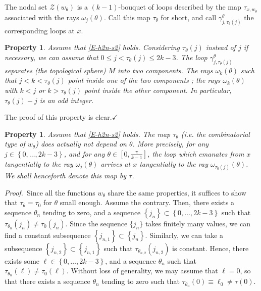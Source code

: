 \documentclass[12pt,a4paper]{amsart}
\theoremstyle{plain} %
\newtheorem{property}[theorem]{Property}
\theoremstyle{definition}
\numberwithin{equation}{section}
\numberwithin{figure}{section}
\numberwithin{table}{section}
\newcommand{\cZ}{\mathcal{Z}}
\newcommand{\pf}{\emph{Proof.~}}
\newcommand{\qedc}{$\checkmark$}
\newcommand{\set}[1]{\left\lbrace #1 \right\rbrace}
\begin{document}
The nodal set $\cZ(w_{\theta})$ is a $(k-1)$-bouquet of loops described by the map $\tau_{x,w_{\theta}}$ associated with the rays $\omega_j(\theta)$. Call this map $\tau_{\theta}$ for short,  and call $\gamma_{j,\tau_{\theta}(j)}^{\theta}$ the corresponding loops at $x$. \smallskip

\begin{property}\label{propertyD3}
 Assume that \eqref{E-h2n-s2} holds.
Considering $\tau_{\theta}(j)$ instead of $j$ if necessary, we can assume that $0 \le j < \tau_{\theta}(j) \le 2k-3$. The loop $\gamma_{j,\tau_{\theta}(j)}^{\theta}$ separates  (the topological sphere) $M$ into two components. The rays $\omega_k(\theta)$ such that $j < k < \tau_{\theta}(j)$ point inside one of the two components ; the rays $\omega_k(\theta)$ with $k < j$ or $k > \tau_{\theta}(j)$ point inside the other component. In particular, $\tau_{\theta}(j) - j$ is an odd integer.
\end{property}%

The proof of this property is clear.\hfill \qedc

\begin{property}\label{propertyD4}
 Assume that \eqref{E-h2n-s2} holds.
The map $\tau_{\theta}$  (i.e. the combinatorial type of $w_{\theta}$) does actually not depend on $\theta$. More precisely, for any $j \in \set{0,\ldots,2k-3}$, and for any $\theta \in \left[ 0,\frac{\pi}{k-1}\right]$, the loop which emanates from $x$ tangentially to the ray $\omega_j(\theta)$ arrives at $x$ tangentially to the ray $\omega_{\tau_0(j)}(\theta)$.  We shall henceforth denote this map by $\tau$.
\end{property}%

\pf Since all the functions $w_{\theta}$ share the same properties, it suffices to show that $\tau_{\theta} = \tau_0$ for $\theta$ small enough. Assume the contrary. Then, there exists a sequence $\theta_n$ tending to zero, and a sequence $\set{j_n} \subset \set{0,\ldots,2k-3}$ such that $\tau_{\theta_n}(j_n) \not = \tau_0(j_n)$. Since the sequence $\{j_n\}$ takes finitely many values, we can find a constant subsequence $\set{j_{n,1}} \subset \set{j_n}$. Similarly, we can take a subsequence $\set{j_{n,2}} \subset \set{j_{n,1}}$  such that $\tau_{\theta_{n,2}}(j_{n,2})$ is constant. Hence, there exists some $\ell \in \set{0,\ldots,2k-3}$, and a sequence $\theta_n$ such that $\tau_{\theta_n}(\ell) \not = \tau_0(\ell)$. Without loss of generality, we may assume that $\ell = 0$, so that there exists a sequence $\theta_n$ tending to zero such that $\tau_{\theta_n}(0) \equiv \ell_0 \not = \tau(0)$.\smallskip
\end{document}
